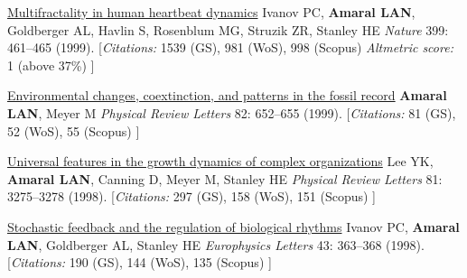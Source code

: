 \NumberedItem{\makebox[0.8cm][r]{[23]}}
\href{/people/amaral/multifractality-in-human-heartbeat-dynamics}
{Multifractality in human heartbeat dynamics}
\newline
Ivanov PC, {\textbf{Amaral LAN}}, Goldberger AL, Havlin S, Rosenblum MG, Struzik ZR, Stanley HE
\newline
\textit{Nature}
    399:
461--465 (1999).
    \newline
    \hfill [{\em{Citations:}} 1539 (GS),
    981 (WoS), 998 (Scopus)
        {\hspace*{1cm} \em{Altmetric score:}}  1 (above 37\%)
    ]
\newline
\Gap
~
\Gap

\NumberedItem{\makebox[0.8cm][r]{[22]}}
\href{/people/amaral/environmental-changes-coextinction-and-patterns-in-the-fossil-record}
{Environmental changes, coextinction, and patterns in the fossil record}
\newline
{\textbf{Amaral LAN}}, Meyer M
\newline
\textit{Physical Review Letters}
    82:
652--655 (1999).
    \newline
    \hfill [{\em{Citations:}} 81 (GS),
    52 (WoS), 55 (Scopus)
    ]
\newline
\Gap
~
\Gap

\NumberedItem{\makebox[0.8cm][r]{[21]}}
\href{/people/amaral/universal-features-in-the-growth-dynamics-of-complex-organizations}
{Universal features in the growth dynamics of complex organizations}
\newline
Lee YK, {\textbf{Amaral LAN}}, Canning D, Meyer M, Stanley HE
\newline
\textit{Physical Review Letters}
    81:
3275--3278 (1998).
    \newline
    \hfill [{\em{Citations:}} 297 (GS),
    158 (WoS), 151 (Scopus)
    ]
\newline
\Gap
~
\Gap

\NumberedItem{\makebox[0.8cm][r]{[20]}}
\href{/people/amaral/stochastic-feedback-and-the-regulation-of-biological-rhythms}
{Stochastic feedback and the regulation of biological rhythms}
\newline
Ivanov PC, {\textbf{Amaral LAN}}, Goldberger AL, Stanley HE
\newline
\textit{Europhysics Letters}
    43:
363--368 (1998).
    \newline
    \hfill [{\em{Citations:}} 190 (GS),
    144 (WoS), 135 (Scopus)
    ]
\newline
\Gap
~
\Gap


